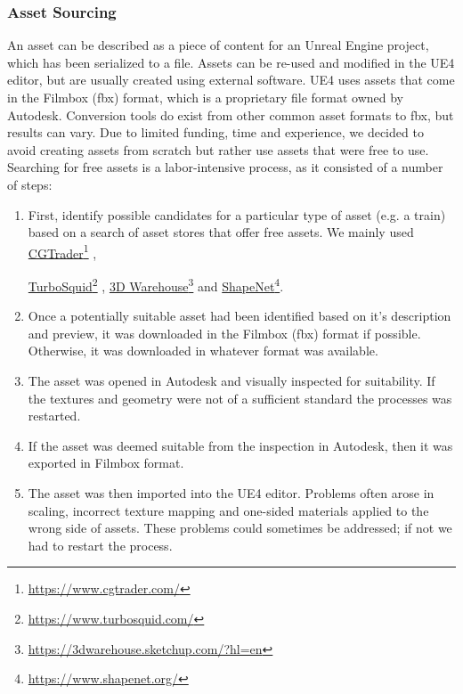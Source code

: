 \subsubsection{Asset Sourcing}
An asset can be described as a piece of content for an Unreal Engine project, which has been serialized to a file. Assets can be re-used and modified in the UE4 editor, but are usually created using external software. UE4 uses assets that come in the Filmbox (fbx) format, which is a proprietary file format owned by Autodesk. Conversion tools do exist from other common asset formats to fbx, but results can vary. Due to limited funding, time and experience, we decided to avoid creating assets from scratch but rather use assets that were free to use. Searching for free assets is a labor-intensive process, as it consisted of a number of steps:
\begin{enumerate}
    \item First, identify possible candidates for a particular type of asset (e.g. a train) based on a search of asset stores that offer free assets. We mainly used \href{https://www.cgtrader.com/}{CGTrader}\footnote{\href {https://www.cgtrader.com/}{https://www.cgtrader.com/}} ,
    
    \href{https://www.turbosquid.com/}{TurboSquid}\footnote{\href {https://www.turbosquid.com/}{https://www.turbosquid.com/}}
    , 
    \href{https://3dwarehouse.sketchup.com/?hl=en}{3D Warehouse}\footnote{\href {https://3dwarehouse.sketchup.com/?hl=en}{https://3dwarehouse.sketchup.com/?hl=en}} 
    and
    \href{https://www.shapenet.org/}{ShapeNet}\footnote{\href {https://www.shapenet.org/}{https://www.shapenet.org/}}.
    
    \item Once a potentially suitable asset had been identified based on it's description and preview, it was downloaded in the Filmbox (fbx) format if possible. Otherwise, it was downloaded in whatever format was available. 
    \item The asset was opened in Autodesk  and visually inspected for suitability. If the textures and geometry were not of a sufficient standard the processes was restarted.
    \item If the asset was deemed suitable from the inspection in Autodesk, then it was exported in Filmbox format.
    \item The asset was then imported into the UE4 editor. Problems often arose in scaling, incorrect texture mapping and one-sided materials applied to the wrong side of assets. These problems could sometimes be addressed; if not we had to restart the process.
\end{enumerate}




